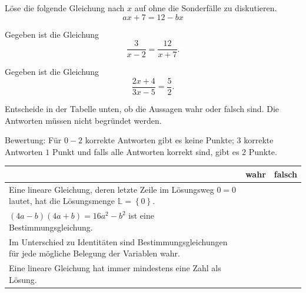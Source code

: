 \documentclass[11pt]{exam}
\begin{document}
\begin{questions}
\question[3]
Löse die folgende Gleichung nach $x$ auf ohne die Sonderfälle zu diskutieren. \[ax+7=12-bx\]

\noaddpoints
\question[\totalpoints]
\addpoints
Gegeben ist die Gleichung \[\frac{3}{x-2}=\frac{12}{x+7}.\] %


\noaddpoints
\question[\totalpoints]
\addpoints
Gegeben ist die Gleichung \[\frac{2x+4}{3x-5}=\frac{5}{2}.\] %


\question[2]
Entscheide in der Tabelle unten, ob die Aussagen wahr oder falsch sind. Die Antworten müssen nicht begründet werden.\newline
\begin{small}
	Bewertung: Für $0-2$ korrekte Antworten gibt es keine Punkte; $3$ korrekte Antworten $1$ Punkt und falls alle Antworten korrekt sind, gibt es $2$ Punkte.
\end{small}
\begingroup
\renewcommand{\arraystretch}{1.5}
\begin{table}[H]
	\centering
	\begin{tabular}{|p{12cm}|c|c|}\hline
		& wahr & falsch \\\hline
		Eine lineare Gleichung, deren letzte Zeile im Lösungsweg $0=0$ lautet, hat die Lösungsmenge $\mathbb{L}=\left\{0\right\}$. & & \\\hline
		$(4a-b)(4a+b)=16a^2-b^2$ ist eine Bestimmungsgleichung. & & \\\hline
		Im Unterschied zu Identitäten sind Bestimmungsgleichungen für jede mögliche Belegung der Variablen wahr.  & & \\\hline
		Eine lineare Gleichung hat immer mindestens eine Zahl als Lösung. & & \\\hline
	\end{tabular}
\end{table}
\endgroup


\end{questions}
\end{document}
